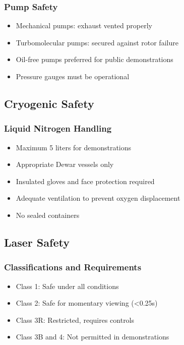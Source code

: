 \subsubsection{Pump Safety}
\begin{itemize}[noitemsep]
    \item Mechanical pumps: exhaust vented properly
    \item Turbomolecular pumps: secured against rotor failure
    \item Oil-free pumps preferred for public demonstrations
    \item Pressure gauges must be operational
\end{itemize}

\subsection{Cryogenic Safety}

\subsubsection{Liquid Nitrogen Handling}
\begin{itemize}[noitemsep]
    \item Maximum 5 liters for demonstrations
    \item Appropriate Dewar vessels only
    \item Insulated gloves and face protection required
    \item Adequate ventilation to prevent oxygen displacement
    \item No sealed containers
\end{itemize}

\subsection{Laser Safety}

\subsubsection{Classifications and Requirements}
\begin{itemize}[noitemsep]
    \item Class 1: Safe under all conditions
    \item Class 2: Safe for momentary viewing (<0.25s)
    \item Class 3R: Restricted, requires controls
    \item Class 3B and 4: Not permitted in demonstrations
\end{itemize}

